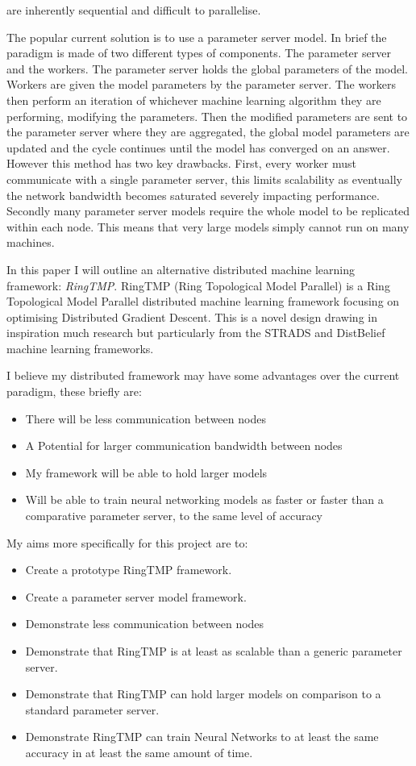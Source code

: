 are inherently sequential and difficult to parallelise.
\par
The popular current solution is to use a parameter server model. In brief the
paradigm is made of two different types of components. The parameter server and
the workers. The parameter server holds the global parameters of the model.
Workers are given the model parameters by the parameter server. The workers then
perform an iteration of whichever machine learning algorithm they are
performing, modifying the parameters. Then the modified parameters are sent to
the parameter server where they are aggregated, the global model parameters are
updated and the cycle continues until the model has converged on an answer.
However this method has two key drawbacks. First, every worker must communicate
with a single parameter server, this limits scalability as eventually the
network bandwidth becomes saturated severely impacting performance.
\cite{LI2014ParameterServers} Secondly many parameter server models require the
whole model to be replicated within each node. \cite{jia2018BeyondData} This
means that very large models simply cannot run on many machines.
\par
In this paper I will outline an alternative distributed machine learning
framework: \textit{RingTMP}. RingTMP (Ring Topological Model Parallel) is a Ring
Topological Model Parallel distributed machine learning framework focusing on
optimising Distributed Gradient Descent. This is a novel design drawing in
inspiration much research but particularly from the STRADS and DistBelief
machine learning frameworks. \cite{kim2016STRADS,Dean2012Distbelief}
\par
I believe my distributed framework may have some advantages over the current
paradigm, these briefly are:
\begin{itemize}
    \item There will be less communication between nodes
    \item A Potential for larger communication bandwidth between nodes
    \item My framework will be able to hold larger models
    \item Will be able to train neural networking models as faster or faster
    than a comparative parameter server, to the same level of accuracy
\end{itemize}

My aims more specifically for this project are to:
\begin{itemize}
    \item Create a prototype RingTMP framework.
    \item Create a parameter server model framework.
    \item Demonstrate less communication between nodes
    \item Demonstrate that RingTMP is at least as scalable than a generic parameter
    server.
    \item Demonstrate that RingTMP can hold larger models on comparison to a
    standard parameter server.
    \item Demonstrate RingTMP can train Neural Networks to at least the same
    accuracy in at least the same amount of time.
\end{itemize}






